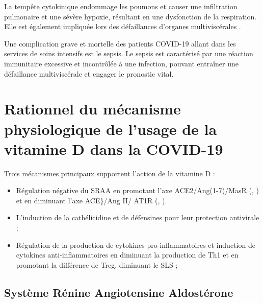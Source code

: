 \documentclass[
  a4paper,
  DIV=11,
  numbers=noendperiod,
  listof=totoc]{scrreprt}
\providecommand{\tightlist}{%
  \setlength{\itemsep}{0pt}\setlength{\parskip}{0pt}}\usepackage{longtable,booktabs,array}
\begin{document}
La tempête cytokinique endommage les poumons et causer une infiltration
pulmonaire et une sévère hypoxie, résultant en une dysfonction de la
respiration. Elle est également impliquée lors des défaillances
d'organes multiviscérales \autocite{Argano.2023}.

Une complication grave et mortelle des patients COVID-19 allant dans les
services de soins intensifs est le sepsis. Le sepsis est caractérisé par
une réaction immunitaire excessive et incontrôlée à une infection,
pouvant entraîner une défaillance multiviscérale et engager le pronostic
vital.

\section{Rationnel du mécanisme physiologique de l'usage de la vitamine
D dans la
COVID-19}\label{rationnel-du-muxe9canisme-physiologique-de-lusage-de-la-vitamine-d-dans-la-covid-19}

Trois mécanismes principaux supportent l'action de la vitamine D
\autocite{Pal.2022,Borsche.2021} :

\begin{itemize}
\tightlist
\item
  Régulation négative du \ac{SRAA} en promotant l'axe ACE2/Ang(1-7)/MasR
  (, ) et en diminuant l'axe ACE\}/Ang II/
  AT1R (, ).
\item
  L'induction de la cathélicidine et de défensines pour leur protection
  antivirale ;
\item
  Régulation de la production de cytokines pro-inflammatoires et
  induction de cytokines anti-inflammatoires en diminuant la production
  de Th1 et en promotant la différence de \ac{Treg}, diminuant le
  \ac{SLS} ;
\end{itemize}

\subsection{Système Rénine Angiotensine
Aldostérone}\label{systuxe8me-ruxe9nine-angiotensine-aldostuxe9rone}
\end{document}
